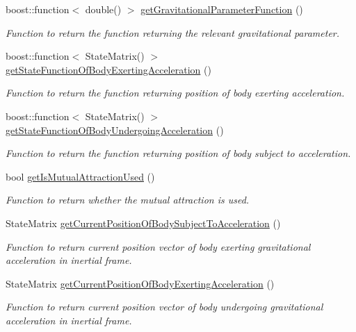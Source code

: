 \begin{DoxyCompactItemize}
boost\+::function$<$ double() $>$ \hyperlink{classtudat_1_1gravitation_1_1SphericalHarmonicsGravitationalAccelerationModelBase_a7b5786da726656d9f343fe038de0526c}{get\+Gravitational\+Parameter\+Function} ()
\begin{DoxyCompactList}\small\item\em Function to return the function returning the relevant gravitational parameter. \end{DoxyCompactList}\item 
boost\+::function$<$ State\+Matrix() $>$ \hyperlink{classtudat_1_1gravitation_1_1SphericalHarmonicsGravitationalAccelerationModelBase_ad4cf21a69755e403a8a349e52491cb21}{get\+State\+Function\+Of\+Body\+Exerting\+Acceleration} ()
\begin{DoxyCompactList}\small\item\em Function to return the function returning position of body exerting acceleration. \end{DoxyCompactList}\item 
boost\+::function$<$ State\+Matrix() $>$ \hyperlink{classtudat_1_1gravitation_1_1SphericalHarmonicsGravitationalAccelerationModelBase_a4782d83bf8ee301a8022837d9cd3b28f}{get\+State\+Function\+Of\+Body\+Undergoing\+Acceleration} ()
\begin{DoxyCompactList}\small\item\em Function to return the function returning position of body subject to acceleration. \end{DoxyCompactList}\item 
bool \hyperlink{classtudat_1_1gravitation_1_1SphericalHarmonicsGravitationalAccelerationModelBase_aab2e6ab909d87470b03ab14eb77855db}{get\+Is\+Mutual\+Attraction\+Used} ()
\begin{DoxyCompactList}\small\item\em Function to return whether the mutual attraction is used. \end{DoxyCompactList}\item 
State\+Matrix \hyperlink{classtudat_1_1gravitation_1_1SphericalHarmonicsGravitationalAccelerationModelBase_abcf8a1d45a47a52bbcb7ddc68ac70edc}{get\+Current\+Position\+Of\+Body\+Subject\+To\+Acceleration} ()
\begin{DoxyCompactList}\small\item\em Function to return current position vector of body exerting gravitational acceleration in inertial frame. \end{DoxyCompactList}\item 
State\+Matrix \hyperlink{classtudat_1_1gravitation_1_1SphericalHarmonicsGravitationalAccelerationModelBase_adf08c02b22b14aee63a1c5c6710245e4}{get\+Current\+Position\+Of\+Body\+Exerting\+Acceleration} ()
\begin{DoxyCompactList}\small\item\em Function to return current position vector of body undergoing gravitational acceleration in inertial frame. \end{DoxyCompactList}\end{DoxyCompactItemize}
